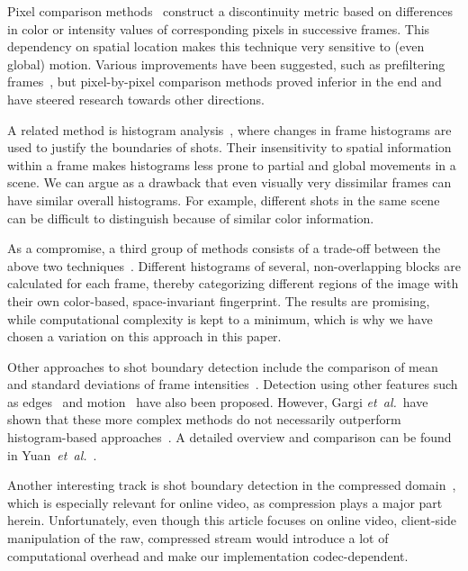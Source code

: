 \documentclass[10pt,twocolumn,letterpaper]{article}
\begin{document}
Pixel comparison methods~\cite{Hampapur1994, Zhang1993} construct a discontinuity metric based on differences in color or intensity values of corresponding pixels in successive frames. This dependency on spatial location makes this technique very sensitive to (even global) motion. Various improvements have been suggested, such as prefiltering frames~\cite{Zhang1995}, but pixel-by-pixel comparison methods proved inferior in the end and have steered research towards other directions.

A related method is histogram analysis~\cite{Smeaton1999}, where changes in frame histograms are used to justify the boundaries of shots. Their insensitivity to spatial information within a frame makes histograms less prone to partial and global movements in a scene. We can argue as a drawback that even visually very dissimilar frames can have similar overall histograms. For example, different shots in the same scene can be difficult to distinguish because of similar color information.

As a compromise, a third group of methods consists of a trade-off between the above two techniques~\cite{Ahmed1999}. Different histograms of several, non-overlapping blocks are calculated for each frame, thereby categorizing different regions of the image with their own color-based, space-invariant fingerprint. The results are promising, while computational complexity is kept to a minimum, which is why we have chosen a variation on this approach in this paper.

Other approaches to shot boundary detection include the comparison of mean and standard deviations of frame intensities~\cite{Lienhart1999}. Detection using other features such as edges~\cite{Zabih1995} and motion~\cite{Bouthemy1997} have also been proposed. However, Gargi \emph{et~al.}\ have shown that these more complex methods do not necessarily outperform histogram-based approaches~\cite{Gargi2000}. A detailed overview and comparison can be found in Yuan~\emph{et~al.}~\cite{Yuan2007}. 

Another interesting track is shot boundary detection in the compressed domain~\cite{Yeo1995}, which is especially relevant for online video, as compression plays a major part herein. Unfortunately, even though this article focuses on online video, client-side manipulation of the raw, compressed stream would introduce a lot of computational overhead and make our implementation codec-dependent.
\end{document}
